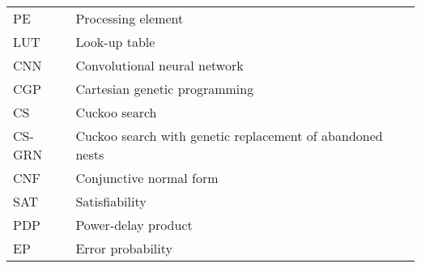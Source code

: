 \begin{table}[h!]
\begin{tabular}{ll}
      PE                &           Processing element\\
      LUT               &           Look-up table\\
      CNN               &           Convolutional neural network\\
      CGP               &           Cartesian genetic programming\\
      CS                &           Cuckoo search\\
      CS-GRN            &           Cuckoo search with genetic replacement of abandoned nests\\
      CNF               &           Conjunctive normal form\\
      SAT               &           Satisfiability\\
      PDP               &           Power-delay product\\
      EP                &           Error probability\\

    \end{tabular}
\end{table}
\pagebreak



\newpage
\renewcommand*\listfigurename{\centering LIST OF FIGURES}
\listoffigures
\begingroup
  \pagestyle{plain}%
  \cleardoublepage
\endgroup
\pagebreak



\newpage
\renewcommand*\listtablename{\centering LIST OF TABLES}
\listoftables




